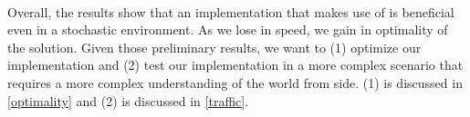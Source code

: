     \paragraph{}
    Overall, the results show that an implementation that makes use of
    \dio{} is beneficial even in a stochastic environment. As we lose in speed, we gain in optimality of the solution. 
    Given those preliminary results, we want to (1) optimize our implementation 
    and (2) test our implementation in a more complex scenario that requires a more complex understanding of the world 
    from \dio{} side. (1) is discussed in \ref{optimality} and (2) is discussed in \ref{traffic}. 

    
